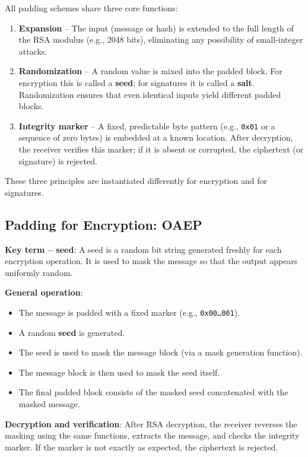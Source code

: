 All padding schemes share three core functions:
\begin{enumerate}
\item \textbf{Expansion} – The input (message or hash) is extended to the full length of the RSA modulus (e.g., 2048 bits), eliminating any possibility of small‑integer attacks.
\item \textbf{Randomization} – A random value is mixed into the padded block. For encryption this is called a \textbf{seed}; for signatures it is called a \textbf{salt}. Randomization ensures that even identical inputs yield different padded blocks.
\item \textbf{Integrity marker} – A fixed, predictable byte pattern (e.g., \texttt{0x01} or a sequence of zero bytes) is embedded at a known location. After decryption, the receiver verifies this marker; if it is absent or corrupted, the ciphertext (or signature) is rejected.
\end{enumerate}
These three principles are instantiated differently for encryption and for signatures.

\subsection{Padding for Encryption: OAEP}

\textbf{Key term – seed}: A seed is a random bit string generated freshly for each encryption operation. It is used to mask the message so that the output appears uniformly random.

\noindent\textbf{General operation}:
\begin{itemize}
\item The message is padded with a fixed marker (e.g., \texttt{0x00…001}).
\item A random \textbf{seed} is generated.
\item The seed is used to mask the message block (via a mask generation function).
\item The message block is then used to mask the seed itself.
\item The final padded block consists of the masked seed concatenated with the masked message.
\end{itemize}

\noindent\textbf{Decryption and verification}: After RSA decryption, the receiver reverses the masking using the same functions, extracts the message, and checks the integrity marker. If the marker is not exactly as expected, the ciphertext is rejected.

